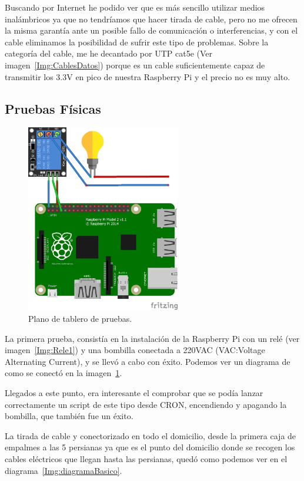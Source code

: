 Buscando por Internet he podido ver que es más sencillo utilizar medios inalámbricos ya que no tendríamos que hacer tirada de cable, pero no me ofrecen la misma garantía ante un posible fallo de comunicación o interferencias, y con el cable eliminamos la posibilidad de sufrir este tipo de problemas. Sobre la categoría del cable, me he decantado por UTP cat5e (Ver imagen~\ref{Img:CablesDatos}) porque es un cable suficientemente capaz de transmitir los 3.3V en pico de nuestra Raspberry Pi y el precio no es muy alto.


\subsection{Pruebas Físicas}

\begin{figure}[h]
    \centering
    \includegraphics[width=0.6\textwidth]{img/Plano_Placa_Pruebas.png}
    \caption{Plano de tablero de pruebas.} \label{Img:Plano_Placa_Pruebas}
\end{figure}

La primera prueba, consistía en la instalación de la Raspberry Pi con un relé (ver imagen~\ref{Img:Rele1}) y una bombilla conectada a 220VAC (VAC:Voltage Alternating Current), y se llevó a cabo con éxito. Podemos ver un diagrama de como se conectó en la imagen~\ref{Img:Plano_Placa_Pruebas}.

Llegados a este punto, era interesante el comprobar que se podía lanzar correctamente un script de este tipo desde CRON, encendiendo y apagando la bombilla, que también fue un éxito.

La tirada de cable y conectorizado en todo el domicilio, desde la primera caja de empalmes a las 5 persianas ya que es el punto del domicilio donde se recogen los cables eléctricos que llegan hasta las persianas, quedó como podemos ver en el diagrama~\ref{Img:diagramaBasico}. 

